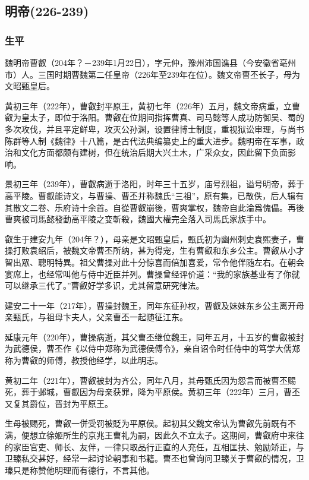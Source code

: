 
\subsection{明帝\tiny(226-239)}

\subsubsection{生平}

魏明帝曹叡（204年？－239年1月22日），字元仲，豫州沛国谯县（今安徽省亳州市）人。三国时期曹魏第二任皇帝（226年至239年在位）。魏文帝曹丕长子，母为文昭甄皇后。

黄初三年（222年），曹叡封平原王，黄初七年（226年）五月，魏文帝病重，立曹叡为皇太子，即位于洛阳。曹叡在位期间指挥曹真、司马懿等人成功防御吴、蜀的多次攻伐，并且平定鲜卑，攻灭公孙渊，设置律博士制度，重视狱讼审理，与尚书陈群等人制《魏律》十八篇，是古代法典编纂史上的重大进步。魏明帝在军事，政治和文化方面都颇有建树，但在统治后期大兴土木，广采众女，因此留下负面影响。

景初三年（239年），曹叡病逝于洛阳，时年三十五岁，庙号烈祖，谥号明帝，葬于高平陵。曹叡能诗文，与曹操、曹丕并称魏氏“三祖”，原有集，已散佚，后人辑有其散文二卷、乐府诗十余首。自從曹叡崩後，曹爽掌权，魏帝自此淪爲傀儡。再後曹爽被司馬懿發動高平陵之变斬殺，魏國大權完全落入司馬氏家族手中。

叡生于建安九年（204年？），母亲是文昭甄皇后，甄氏初为幽州刺史袁熙妻子，曹操打败袁绍后，被魏文帝曹丕所纳，甚为得宠，生有曹叡和东乡公主。曹叡从小才智出眾、聰明特異。祖父曹操对此十分惊喜而倍加喜爱，常令他伴随左右。在朝会宴席上，也经常叫他与侍中近臣并列。曹操曾经评价道：“我的家族基业有了你就可以继承三代了。”曹叡好学多识，尤其留意研究律法。

建安二十一年（217年），曹操封魏王，同年东征孙权，曹叡及妹妹东乡公主离开母亲甄氏，与祖母卞夫人，父亲曹丕一起随征江东。

延康元年（220年），曹操病逝，其父曹丕继位魏王，同年五月，十五岁的曹叡被封为武德侯，曹丕作《以侍中郑称为武德侯傅令》，亲自诏令时任侍中的笃学大儒郑称为曹叡的师傅，教授他经学，以此明志。

黄初二年（221年），曹叡被封为齐公，同年八月，其母甄氏因为怨言而被曹丕赐死，葬于邺城，曹叡因为母亲获罪，降为平原侯。黄初三年（222年）三月，曹丕又复其爵位，晋封为平原王。

生母被赐死，曹叡一併受罚被貶为平原侯。起初其父魏文帝认为曹叡先前既有不满，便想立徐姬所生的京兆王曹礼为嗣，因此久不立太子。这期间，曹叡府中来往的家臣官吏、师长、友伴，一律只取品行正直的人充任，互相匡扶、勉励矫正，与卫臻私交甚好，经常一起讨论朝事和书籍。曹丕也曾询问卫臻关于曹叡的情况，卫瑧只是称赞他明理而有德行，不言其他。

